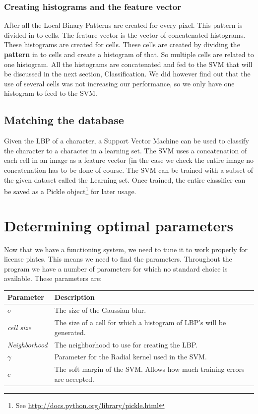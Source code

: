 \documentclass[a4paper]{article}
\begin{document}
\subsubsection{Creating histograms and the feature vector}

After all the Local Binary Patterns are created for every pixel. This pattern is
divided in to cells. The feature vector is the vector of concatenated
histograms. These histograms are created for cells. These cells are created by
dividing the \textbf{pattern} in to cells and create a histogram of that. So
multiple cells are related to one histogram. All the histograms are concatenated
and fed to the SVM that will be discussed in the next section, Classification.
We did however find out that the use of several cells was not increasing our
performance, so we only have one histogram to feed to the SVM.


\subsection{Matching the database}

Given the LBP of a character, a Support Vector Machine can be used to classify
the character to a character in a learning set. The SVM uses a concatenation of
each cell in an image as a feature vector (in the case we check the entire image
no concatenation has to be done of course. The SVM can be trained with a subset
of the given dataset called the Learning set. Once trained, the entire
classifier can be saved as a Pickle object\footnote{See
\url{http://docs.python.org/library/pickle.html}} for later usage.


\section{Determining optimal parameters}

Now that we have a functioning system, we need to tune it to work properly for
license plates. This means we need to find the parameters. Throughout the
program we have a number of parameters for which no standard choice is
available. These parameters are:

\begin{tabular}{l|l}
  Parameter       & Description\\
  \hline
  $\sigma$        & The size of the Gaussian blur.\\
  \emph{cell size}  & The size of a cell for which a histogram of LBP's
                        will be generated.\\
  \emph{Neighborhood}& The neighborhood to use for creating the LBP.\\
  $\gamma$      & Parameter for the Radial kernel used in the SVM.\\
  $c$         & The soft margin of the SVM. Allows how much training
              errors are accepted.\\
\end{tabular}
\end{document}
